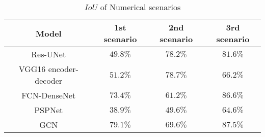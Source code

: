 \begin{table}[]
	\centering
	\caption{\(IoU\) of Numerical scenarios}
	\label{tab:table_numerical_scenarios}
	\resizebox{\textwidth}{!}
	{
		\begin{tabular}{cccc}\hline
			Model & 1st scenario & 2nd scenario & 3rd scenario \\ \hline
			Res-UNet & \(49.8\%\) & \(78.2\%\) & \(81.6\%\)  \\ 
			VGG16 encoder-decoder & \(51.2\%\) & \(78.7\%\)  & \(66.2\%\)  \\
			FCN-DenseNet & \(73.4\%\)  & \(61.2\%\)  & \(86.6\%\)  \\ 
			PSPNet & \(38.9\%\) & \(49.6\%\) & \(64.6\%\)  \\ 
			GCN & \(79.1\%\) & \(69.6\%\) & \(87.5\%\) \\ \hline
		\end{tabular}
	}
\end{table}

